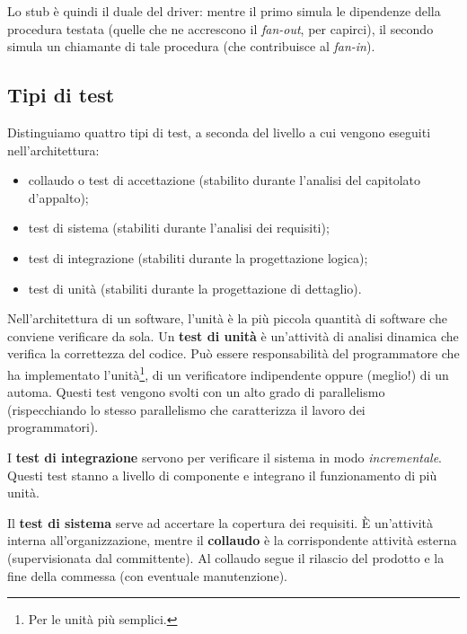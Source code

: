 \documentclass[a4paper]{article}
\begin{document}
		
Lo stub è quindi il duale del driver: mentre il primo simula le dipendenze della procedura testata (quelle che ne accrescono il \emph{fan-out}, per capirci), il secondo simula un chiamante di tale procedura (che contribuisce al \emph{fan-in}).

		
	\subsection{Tipi di test}

		
Distinguiamo quattro tipi di test, a seconda del livello a cui vengono eseguiti nell'architettura:
		
	\begin{itemize}
		
			
	\item collaudo o test di accettazione (stabilito durante l'analisi del capitolato d'appalto);
			
	\item test di sistema (stabiliti durante l'analisi dei requisiti);
			
	\item test di integrazione (stabiliti durante la progettazione logica);
			
	\item test di unità (stabiliti durante la progettazione di dettaglio).
		
	\end{itemize}

		
Nell'architettura di un software, l'unità è la più piccola quantità di software che conviene verificare da sola. Un \textbf{test di unità} è un'attività di analisi dinamica che verifica la correttezza del codice. Può essere responsabilità del programmatore che ha implementato l'unità\footnote{Per le unità più semplici.}, di un verificatore indipendente oppure (meglio!) di un automa. Questi test vengono svolti con un alto grado di parallelismo (rispecchiando lo stesso parallelismo che caratterizza il lavoro dei programmatori).
		
I \textbf{test di integrazione} servono per verificare il sistema in modo \emph{incrementale}. Questi test stanno a livello di componente e integrano il funzionamento di più unità.
		
Il \textbf{test di sistema} serve ad accertare la copertura dei requisiti. È un'attività interna all'organizzazione, mentre il \textbf{collaudo} è la corrispondente attività esterna (supervisionata dal committente). Al collaudo segue il rilascio del prodotto e la fine della commessa (con eventuale manutenzione).
		
\end{document}
